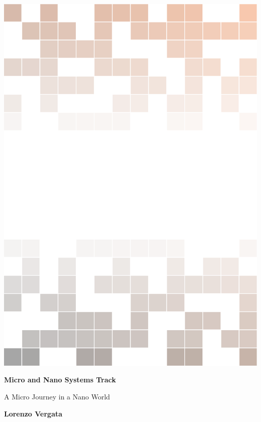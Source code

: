 \documentclass[
11pt, %
fleqn, %
a4paper, %
]{LegrandOrangeBook}
\begin{document}
	
	
	\titlepage %
	{\includegraphics[width=\paperwidth]{Images/background.pdf}} %
	{ %
		\centering\sffamily %
		{\Huge\bfseries Micro and Nano Systems Track\par} %
		\vspace{16pt} %
		{\LARGE A Micro Journey in a Nano World\par} %
		\vspace{24pt} %
		{\Huge\bfseries Lorenzo Vergata\par} %
	}
	
\end{document}

